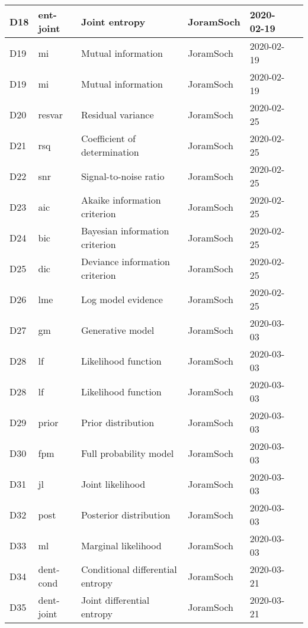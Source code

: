 \documentclass[a4paper,12pt,twoside]{book}
\begin{document}
\begin{longtable}{|p{1cm}|p{2cm}|p{6.5cm}|p{3cm}|p{2cm}|c|}
D18 & ent-joint & Joint entropy & JoramSoch & 2020-02-19 & \pageref{sec:ent-joint} \\ \hline
D19 & mi & Mutual information & JoramSoch & 2020-02-19 & \pageref{sec:mi} \\ \hline
D19 & mi & Mutual information & JoramSoch & 2020-02-19 & \pageref{sec:mi} \\ \hline
D20 & resvar & Residual variance & JoramSoch & 2020-02-25 & \pageref{sec:resvar} \\ \hline
D21 & rsq & Coefficient of determination & JoramSoch & 2020-02-25 & \pageref{sec:rsq} \\ \hline
D22 & snr & Signal-to-noise ratio & JoramSoch & 2020-02-25 & \pageref{sec:snr} \\ \hline
D23 & aic & Akaike information criterion & JoramSoch & 2020-02-25 & \pageref{sec:aic} \\ \hline
D24 & bic & Bayesian information criterion & JoramSoch & 2020-02-25 & \pageref{sec:bic} \\ \hline
D25 & dic & Deviance information criterion & JoramSoch & 2020-02-25 & \pageref{sec:dic} \\ \hline
D26 & lme & Log model evidence & JoramSoch & 2020-02-25 & \pageref{sec:lme} \\ \hline
D27 & gm & Generative model & JoramSoch & 2020-03-03 & \pageref{sec:gm} \\ \hline
D28 & lf & Likelihood function & JoramSoch & 2020-03-03 & \pageref{sec:lf} \\ \hline
D28 & lf & Likelihood function & JoramSoch & 2020-03-03 & \pageref{sec:lf} \\ \hline
D29 & prior & Prior distribution & JoramSoch & 2020-03-03 & \pageref{sec:prior} \\ \hline
D30 & fpm & Full probability model & JoramSoch & 2020-03-03 & \pageref{sec:fpm} \\ \hline
D31 & jl & Joint likelihood & JoramSoch & 2020-03-03 & \pageref{sec:jl} \\ \hline
D32 & post & Posterior distribution & JoramSoch & 2020-03-03 & \pageref{sec:post} \\ \hline
D33 & ml & Marginal likelihood & JoramSoch & 2020-03-03 & \pageref{sec:ml} \\ \hline
D34 & dent-cond & Conditional differential entropy & JoramSoch & 2020-03-21 & \pageref{sec:dent-cond} \\ \hline
D35 & dent-joint & Joint differential entropy & JoramSoch & 2020-03-21 & \pageref{sec:dent-joint} \\ \hline

\end{longtable}
\end{document}
